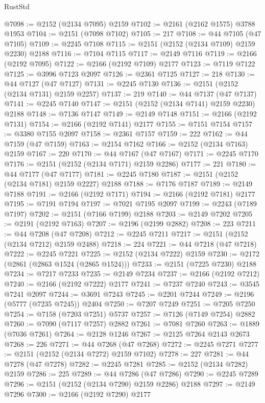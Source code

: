 \begin{lexlean}{RustStd}
\begin{coremodule}
@7098 := @2152 (@2134 @7095) @2159
@7102 := @2161 (@2162 @1575) @3788 @1953
@7104 := @2151 (@7098 @7102)
@7105 := 217
@7108 := @44 @7105 (@47 @7105)
@7109 := @2245 @7108
@7115 := @2151 (@2152 (@2134 @7109) @2159 @2230) @2188
@7116 := @7104 @7115
@7117 := @2149 @7116
@7119 := @2166 (@2192 @7095)
@7122 := @2166 (@2192 @7109) @2177
@7123 := @7119 @7122
@7125 := @3996 @7123 @2097
@7126 := @2361 @7125
@7127 := 218
@7130 := @44 @7127 (@47 @7127)
@7131 := @2245 @7130
@7136 := @2151 (@2152 (@2134 @7131) @2159 @2257)
@7137 := 219
@7140 := @44 @7137 (@47 @7137)
@7141 := @2245 @7140
@7147 := @2151 (@2152 (@2134 @7141) @2159 @2230) @2188
@7148 := @7136 @7147
@7149 := @2149 @7148
@7151 := @2166 (@2192 @7131)
@7154 := @2166 (@2192 @7141) @2177
@7155 := @7151 @7154
@7157 := @3380 @7155 @2097
@7158 := @2361 @7157
@7159 := 222
@7162 := @44 @7159 (@47 @7159)
@7163 := @2154 @7162
@7166 := @2152 (@2134 @7163) @2159
@7167 := 220
@7170 := @44 @7167 (@47 @7167)
@7171 := @2245 @7170
@7176 := @2151 (@2152 (@2134 @7171) @2159 @2286)
@7177 := 221
@7180 := @44 @7177 (@47 @7177)
@7181 := @2245 @7180
@7187 := @2151 (@2152 (@2134 @7181) @2159 @2227) @2188
@7188 := @7176 @7187
@7189 := @2149 @7188
@7191 := @2166 (@2192 @7171)
@7194 := @2166 (@2192 @7181) @2177
@7195 := @7191 @7194
@7197 := @7021 @7195 @2097
@7199 := @2243 (@7189 @7197)
@7202 := @2151 (@7166 @7199) @2188
@7203 := @2149 @7202
@7205 := @2191 (@2192 @7163)
@7207 := @2196 (@2199 @2882)
@7208 := 223
@7211 := @44 @7208 (@47 @7208)
@7212 := @2245 @7211
@7217 := @2151 (@2152 (@2134 @7212) @2159 @2488)
@7218 := 224
@7221 := @44 @7218 (@47 @7218)
@7222 := @2245 @7221
@7225 := @2152 (@2134 @7222) @2159
@7230 := @2172 (@2861 (@2863 @1524 (@2865 @1524)))
@7233 := @2151 (@7225 @7230) @2188
@7234 := @7217 @7233
@7235 := @2149 @7234
@7237 := @2166 (@2192 @7212)
@7240 := @2166 (@2192 @7222) @2177
@7241 := @7237 @7240
@7243 := @3545 @7241 @2097
@7244 := @3691 @7243
@7245 := @2201 @7244
@7249 := @2196 (@5777 (@7235 @7245)) @2404
@7250 := @7207 @7249
@7251 := @7205 @7250
@7254 := @7158 (@7203 @7251) @5737
@7257 := @7126 (@7149 @7254) @2882
@7260 := @7090 (@7117 @7257) @2882
@7261 := @7081 @7260
@7263 := @1889 (@7036 @7261)
@7264 := @2128 @1246
@7267 := @2125 @7264 @2143 @2673
@7268 := 226
@7271 := @44 @7268 (@47 @7268)
@7272 := @2245 @7271
@7277 := @2151 (@2152 (@2134 @7272) @2159 @7102)
@7278 := 227
@7281 := @44 @7278 (@47 @7278)
@7282 := @2245 @7281
@7285 := @2152 (@2134 @7282) @2159
@7286 := 225
@7289 := @44 @7286 (@47 @7286)
@7290 := @2245 @7289
@7296 := @2151 (@2152 (@2134 @7290) @2159 @2286) @2188
@7297 := @2149 @7296
@7300 := @2166 (@2192 @7290) @2177

\end{coremodule}
\end{lexlean}
